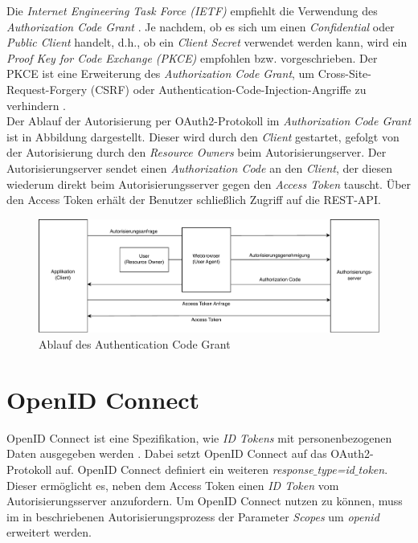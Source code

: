 Die \textit{Internet Engineering Task Force (IETF)} empfiehlt die Verwendung des \textit{Authorization Code Grant} \cite[Unterabschnitt~2.1.1]{ietf-oauth-security-topics-18}. 
Je nachdem, ob es sich um einen \textit{Confidential} oder \textit{Public Client} handelt, d.h., ob ein \textit{Client Secret} verwendet werden kann, wird ein \textit{Proof Key for Code Exchange (PKCE)} empfohlen bzw. vorgeschrieben. 
Der PKCE ist eine Erweiterung des \textit{Authorization Code Grant}, um Cross-Site-Request-Forgery (CSRF) oder Authentication-Code-Injection-Angriffe zu verhindern \cite{rfc7636}. \\

Der Ablauf der Autorisierung per OAuth2-Protokoll im \textit{Authorization Code Grant} ist in Abbildung  dargestellt. 
Dieser wird durch den \textit{Client} gestartet, gefolgt von der Autorisierung durch den \textit{Resource Owners} beim Autorisierungserver. 
Der Autorisierungserver sendet einen \textit{Authorization Code} an den \textit{Client}, der diesen wiederum direkt beim Autorisierungsserver gegen den \textit{Access Token} tauscht. Über den Access Token erhält der Benutzer schließlich Zugriff auf die REST-API.

\begin{figure}[htbp]
\centering
\includegraphics[width=\textwidth]{Authentication_Code_Grant.pdf}
\caption{Ablauf des Authentication Code Grant}
\label{fig:auth-code-grant}
\end{figure}

\section{OpenID Connect}
\label{auth:openid}

OpenID Connect ist eine Spezifikation, wie \textit{ID Tokens} mit personenbezogenen Daten ausgegeben werden \cite{OpenID.Core}. 
Dabei setzt OpenID Connect auf das OAuth2-Protokoll auf. 
OpenID Connect definiert ein weiteren \textit{response$\_$type=id$\_$token}. 
Dieser ermöglicht es, neben dem Access Token einen \textit{ID Token} vom Autorisierungsserver anzufordern. 
Um OpenID Connect nutzen zu können, muss im in  beschriebenen Autorisierungsprozess der Parameter \textit{Scopes} um \textit{openid} erweitert werden. \\

